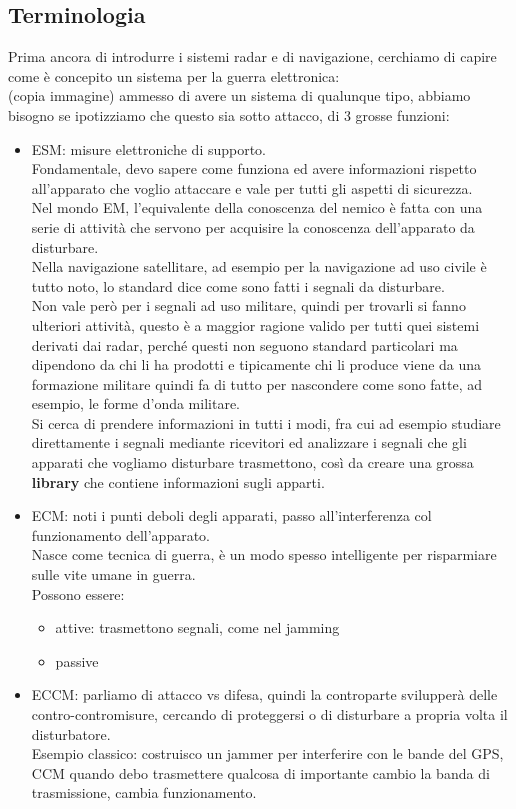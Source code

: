 \documentclass[oneside, 12pt]{extbook}
\begin{document}
\subsection{Terminologia}
Prima ancora di introdurre i  sistemi radar e di navigazione, cerchiamo di capire come è concepito un sistema per la guerra elettronica:\\
(copia immagine)
ammesso di avere un sistema di qualunque tipo, abbiamo bisogno se ipotizziamo che questo sia sotto attacco, di 3 grosse funzioni:
\begin{itemize}
	\item ESM: misure elettroniche di supporto.
	\\Fondamentale, devo sapere come funziona ed avere informazioni rispetto all'apparato che voglio attaccare e vale per tutti gli aspetti di sicurezza.
	\\Nel mondo EM, l'equivalente della conoscenza del nemico è fatta con una serie di attività che servono per acquisire la conoscenza dell'apparato da disturbare.
	\\Nella navigazione satellitare, ad esempio per la navigazione ad uso civile è tutto noto, lo standard dice come sono fatti i segnali da disturbare.
	\\Non vale però per i segnali ad uso militare, quindi per trovarli si fanno ulteriori attività, questo è a maggior ragione valido per tutti quei sistemi derivati dai radar, perché questi non seguono standard particolari ma dipendono da chi li ha prodotti e tipicamente chi li produce viene da una formazione militare quindi fa di tutto per nascondere come sono fatte, ad esempio, le forme d'onda militare.
	\\Si cerca di prendere informazioni in tutti i modi, fra cui ad esempio studiare direttamente i segnali mediante ricevitori ed analizzare i segnali che gli apparati che vogliamo disturbare trasmettono, così da creare una grossa \textbf{library} che contiene informazioni sugli apparti.
	\item ECM: noti i punti deboli degli apparati, passo all'interferenza col funzionamento dell'apparato.
	\\Nasce come tecnica di guerra, è un modo spesso intelligente per risparmiare sulle vite umane in guerra.
	\\Possono essere:
	\begin{itemize}
		\item attive: trasmettono segnali, come nel jamming
		\item passive
	\end{itemize}
	\item ECCM: parliamo di attacco vs difesa, quindi la controparte svilupperà delle contro-contromisure, cercando di proteggersi o di disturbare a propria volta il disturbatore.
	\\Esempio classico: costruisco un jammer per interferire con le bande del GPS, CCM quando debo trasmettere qualcosa di importante cambio la banda di trasmissione, cambia funzionamento.
\end{itemize}
\end{document}
